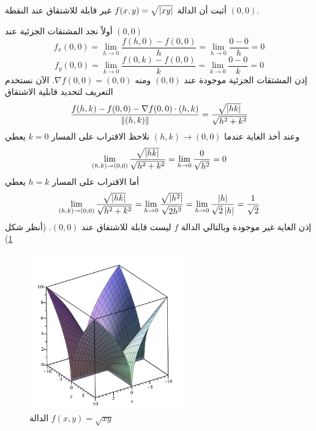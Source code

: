 \begin{example}
    أثبت أن الدالة $f(x,y)=\sqrt{\left|xy\right|}$ غير قابلة للاشتقاق عند النقطة $(0,0)$.
\end{example}
\begin{myproof}
    أولاً نجد المشتقات الجزئية عند $(0,0)$ 
    \[
    f_x(0,0)=\lim\limits_{h\to0}\frac{f(h,0)-f(0,0)}{h}=\lim\limits_{h\to0}\frac{0-0}{h}=0
    \]
    \[
    f_y(0,0)=\lim\limits_{k\to0}\frac{f(0,k)-f(0,0)}{k}=\lim\limits_{k\to0}\frac{0-0}{k}=0
    \]
إذن المشتقات الجزئية موجودة عند $(0,0)$ ومنه $\nabla f(0,0)=(0,0)$. الآن نستخدم التعريف لتحديد قابلية الاشتقاق
\[
\frac{f(h,k)-f(0,0)-\nabla f(0,0)\cdot (h,k)}{\left\|(h,k)\right\|}=\frac{\sqrt{\left|hk\right|}}{\sqrt{h^2+k^2}}
\]
وعند أخذ الغاية عندما $(h,k)\to(0,0)$ نلاحظ الاقتراب على المسار $k=0$ يعطي
\[
\lim\limits_{(h,k)\to(0,0)}\frac{\sqrt{\left|hk\right|}}{\sqrt{h^2+k^2}}=\lim\limits_{h\to0}\frac{0}{\sqrt{h^2}}=0
\]
أما الاقتراب على المسار $h=k$ يعطي
\[
\lim\limits_{(h,k)\to(0,0)}\frac{\sqrt{\left|hk\right|}}{\sqrt{h^2+k^2}}=\lim\limits_{h\to0}\frac{\sqrt{\left|h^2\right|}}{\sqrt{2h^2}}=\lim\limits_{h\to0}\frac{\left|h\right|}{\sqrt{2}\left|h\right|}=\frac{1}{\sqrt{2}}
\]
إذن الغاية غير موجودة وبالتالي الدالة $f$ ليست قابلة للاشتقاق عند $(0,0)$. (أنظر شكل \ref{fig:sqrt_xy})
\end{myproof}
\begin{figure}[ht]
    \centering
    \includegraphics[width=0.6\textwidth]{plots/function5.png}
    \caption{الدالة $f(x,y)=\sqrt{xy}$}
    \label{fig:sqrt_xy}
\end{figure}

